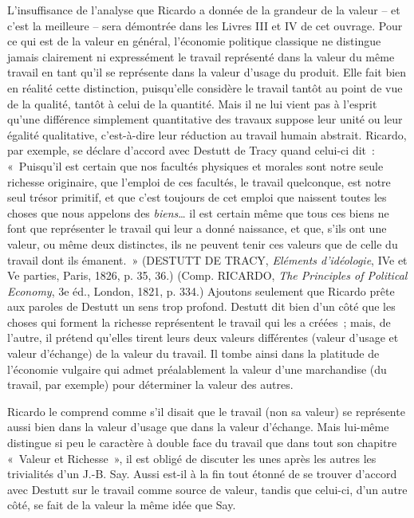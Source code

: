 \documentclass[french,twoside]{book} %
\begin{document}
{L’insuffisance de l’analyse que Ricardo a donnée de la grandeur de la valeur – et c’est la meilleure – sera démontrée dans les Livres III et IV de cet ouvrage. Pour ce qui est de la valeur en général, l’économie politique classique ne distingue jamais clairement ni expressément le travail représenté dans la valeur du même travail en tant qu’il se représente dans la valeur d’usage du produit. Elle fait bien en réalité cette distinction, puisqu’elle considère le travail tantôt au point de vue de la qualité, tantôt à celui de la quantité. Mais il ne lui vient pas à l’esprit qu’une différence simplement quantitative des travaux suppose leur unité ou leur égalité qualitative, c’est-à-dire leur réduction au travail humain abstrait. Ricardo, par exemple, se déclare d’accord avec Destutt de Tracy quand celui-ci dit : « Puisqu’il est certain que nos facultés physiques et morales sont notre seule richesse originaire, que l’emploi de ces facultés, le travail quelconque, est notre seul trésor primitif, et que c’est toujours de cet emploi que naissent toutes les choses que nous appelons des \emph{biens}… il est certain même que tous ces biens ne font que représenter le travail qui leur a donné naissance, et que, s’ils ont une valeur, ou même deux distinctes, ils ne peuvent tenir ces valeurs que de celle du travail dont ils émanent. » (DESTUTT DE TRACY, \emph{Eléments d’idéologie}, IVe et Ve parties, Paris, 1826, p. 35, 36.) (Comp. RICARDO, \emph{The Principles of Political Economy}, 3e éd., London, 1821, p. 334.) Ajoutons seulement que Ricardo prête aux paroles de Destutt un sens trop profond. Destutt dit bien d’un côté que les choses qui forment la richesse représentent le travail qui les a créées ; mais, de l’autre, il prétend qu’elles tirent leurs deux valeurs différentes (valeur d’usage et valeur d’échange) de la valeur du travail. Il tombe ainsi dans la platitude de l’économie vulgaire qui admet préalablement la valeur d’une marchandise (du travail, par exemple) pour déterminer la valeur des autres.\par
 Ricardo le comprend comme s’il disait que le travail (non sa valeur) se représente aussi bien dans la valeur d’usage que dans la valeur d’échange. Mais lui-même distingue si peu le caractère à double face du travail que dans tout son chapitre « Valeur et Richesse », il est obligé de discuter les unes après les autres les trivialités d’un J.-B. Say. Aussi est-il à la fin tout étonné de se trouver d’accord avec Destutt sur le travail comme source de valeur, tandis que celui-ci, d’un autre côté, se fait de la valeur la même idée que Say.
}
\end{document}
